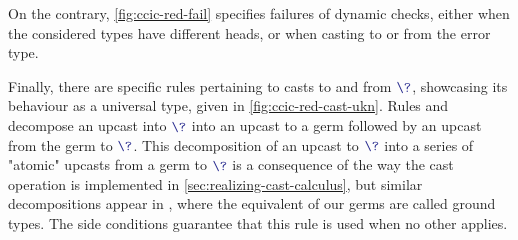 \begin{figure*}[h]
  \ContinuedFloat
  \caption{Failure rules for casts}
  \label{fig:ccic-red-fail}
\end{figure*}

On the contrary, \cref{fig:ccic-red-fail} specifies failures of dynamic checks, either when the considered types have different heads, or when casting to or from the
error type.

\begin{figure*}[ht]
  \ContinuedFloat
  \caption{Casts and the unknown type}
  \label{fig:ccic-red-cast-ukn}
\end{figure*}

Finally, there are specific rules pertaining to casts to and from $\tcol{\?}$,
showcasing its behaviour as a universal type, given in \cref{fig:ccic-red-cast-ukn}.
Rules  and  decompose an upcast into
$\tcol{\?}$ into an upcast to a germ followed by an upcast from the germ to $\tcol{\?}$.
This decomposition of an upcast to $\tcol{\?}$ into a series of "atomic" upcasts from a germ to
$\tcol{\?}$ is a consequence of the way the cast operation is implemented in
\cref{sec:realizing-cast-calculus}, but similar decompositions appear \eg in ,
where the equivalent of our germs are called ground types.
The side conditions guarantee that this rule is used when no other applies.

